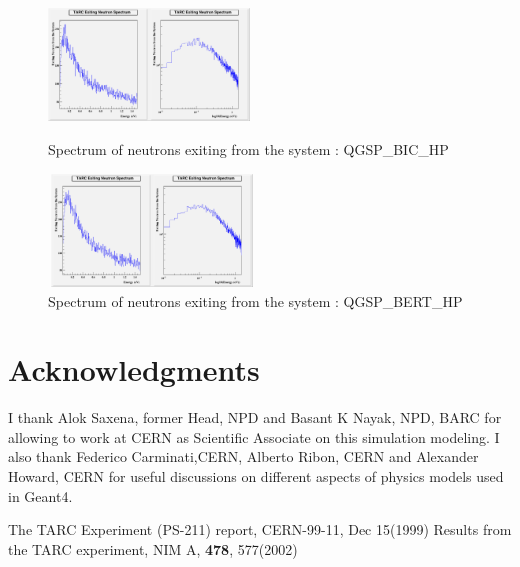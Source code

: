 \documentclass[twocolumn,amsmath,amssymb]{snp}
\begin{document}
\begin{figure}
    \centering 
    \begin{minipage}[b]{0.4\textwidth}
        \includegraphics [height=30mm, width=55 mm] {ExitingNSpectrumBIC.png}
        \caption{\small Spectrum of neutrons exiting from the system : QGSP\_BIC\_HP}
    \end{minipage}
    \begin{minipage}[b]{0.4\textwidth}
        \includegraphics [height=30mm, width=55mm] {ExitingNSpectrumBERT.png}
        \caption{\small Spectrum of neutrons exiting from the system : QGSP\_BERT\_HP}
    \end{minipage}
\end{figure}


\section*{Acknowledgments}
I thank Alok Saxena, former Head, NPD and Basant K Nayak, NPD, BARC for allowing to work at CERN as Scientific Associate on this simulation modeling. I also thank Federico Carminati,CERN, Alberto Ribon, CERN and Alexander Howard, CERN for useful discussions on different aspects of physics models used in Geant4.

\begin{thebibliography}{50}
 The TARC Experiment (PS-211) report, CERN-99-11, Dec 15(1999)
 Results from the TARC experiment, NIM A, {\bf 478}, 577(2002)
\end{thebibliography}
\end{document}

